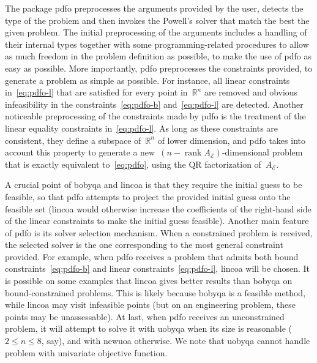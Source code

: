\documentclass[11pt,draft]{article}
\numberwithin{equation}{section}
\DeclareMathOperator\rank{rank}
\def\R{\ensuremath{\mathds{R}}}
\def\aeq{\ensuremath{A_{\scriptscriptstyle\mathcal{E}}}}
\begin{document}
The package \gls{pdfo} preprocesses the arguments provided by the user, detects the type of the problem and then invokes the Powell's solver that match the best the given problem.
The initial preprocessing of the arguments includes a handling of their internal types together with some programming-related procedures to allow as much freedom in the problem definition as possible, to make
the use of \gls{pdfo} as easy as possible.
More importantly, \gls{pdfo} preprocesses the constraints provided, to generate a problem as simple as possible.
For instance, all linear constraints in~\eqref{eq:pdfo-l} that are satisfied for every point in~$\R^n$ are removed and obvious infeasibility in the constraints~\eqref{eq:pdfo-b} and~\eqref{eq:pdfo-l} are detected.
Another noticeable preprocessing of the constraints made by \gls{pdfo} is the treatment of the linear equality constraints in~\eqref{eq:pdfo-l}.
As long as these constraints are consistent, they define a subspace of~$\R^n$ of lower dimension, and \gls{pdfo} takes into account this property to generate a new~$(n - \rank \aeq)$-dimensional problem that is exactly equivalent to~\eqref{eq:pdfo}, using the QR factorization of~$\aeq$.

A crucial point of \gls{bobyqa} and \gls{lincoa} is that they require the initial guess to be feasible, so that \gls{pdfo} attempts to project the provided initial guess onto the feasible set (\gls{lincoa} would otherwise increase the coefficients of the right-hand side of the linear constraints to make the initial guess feasible).
Another main feature of \gls{pdfo} is its solver selection mechanism.
When a constrained problem is received, the selected solver is the one corresponding to the most general constraint provided.
For example, when \gls{pdfo} receives a problem that admits both bound constraints~\eqref{eq:pdfo-b} and linear constraints~\eqref{eq:pdfo-l}, \gls{lincoa} will be chosen.
It is possible on some examples that \gls{lincoa} gives better results than \gls{bobyqa} on bound-constrained problems.
This is likely because \gls{bobyqa} is a feasible method, while \gls{lincoa} may visit infeasible points (but on an engineering problem, these points may be unassessable).
At last, when \gls{pdfo} receives an unconstrained problem, it will attempt to solve it with \gls{uobyqa} when its size is reasonable ($2 \le n \le 8$, say), and with \gls{newuoa} otherwise.
We note that \gls{uobyqa} cannot handle problem with univariate objective function.
\end{document}
